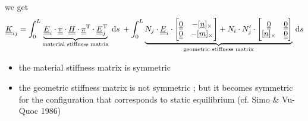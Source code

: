 \begin{frame}
  \vspace{0.3em}
  we get 
  \begin{displaymath}
    \doubleunderline{K}_{ij} =
    \int_0^L
    \underbrace{
      \doubleunderline{E}_i \cdot
      \doubleunderline{\pi} \cdot
      \doubleunderline{H} \cdot
      \doubleunderline{\pi}^{\mathrm{T}} \cdot
      \doubleunderline{E}_j^{\mathrm{T}}
    }_{\text{material stiffness matrix}}
    \: \dif s \: +
    \int_0^L
    \underbrace{
      N_j \cdot \doubleunderline{E}_i \cdot
      \begin{bmatrix}
        \doubleunderline{0} & - [ \underline{n} ]_{\times} \\
        \doubleunderline{0} & - [ \underline{m} ]_{\times}
      \end{bmatrix} +
      N_i \cdot N_j^{\prime} \cdot 
      \begin{bmatrix}
        \doubleunderline{0} & \doubleunderline{0} \\
        [\underline{n} ]_{\times} & \doubleunderline{0}
      \end{bmatrix}
    }_{\text{geometric stiffness matrix}}
    \: \dif s 
  \end{displaymath}
  
  \begin{itemize}
    \item the material stiffness matrix is symmetric
    \item the geometric stiffness matrix is not symmetric ; but it becomes symmetric for the configuration that corresponds to static equilibrium (cf. Simo \& Vu-Quoc 1986)
  \end{itemize}
\end{frame}


